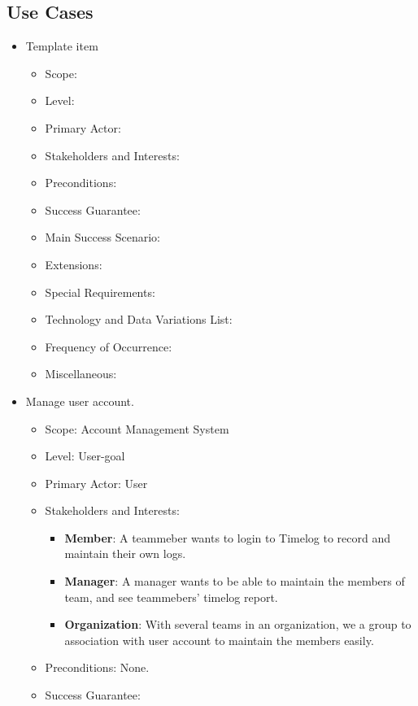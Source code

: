\documentclass[12pt, a4paper]{article}
\begin{document}
\begin{CJK*}{UTF8}{bkai}
  \subsection{Use Cases}
    \begin{itemize}
      \item {{Template item}}
        \begin{itemize}
          \item Scope:
          \item Level:
          \item Primary Actor:
          \item Stakeholders and Interests:
          \item Preconditions:
          \item Success Guarantee:
          \item Main Success Scenario:
          \item Extensions:
          \item Special Requirements:
          \item Technology and Data Variations List:
          \item Frequency of Occurrence:
          \item Miscellaneous:
        \end{itemize}
      \item Manage user account.
        \begin{itemize}
          \item Scope: Account Management System
          \item Level: User-goal
          \item Primary Actor: User
          \item Stakeholders and Interests:
            \begin{itemize}
              \item {\bf Member}: A teammeber wants to login to Timelog to record and maintain their own logs.
              \item {\bf Manager}: A manager wants to be able to maintain the members of team, and see teammebers' timelog report.
              \item {\bf Organization}: With several teams in an organization, we a group to association with user account to maintain the members easily.
            \end{itemize}
          \item Preconditions: None.
          \item Success Guarantee:

\end{itemize}
\end{itemize}
\end{CJK*}
\end{document}
